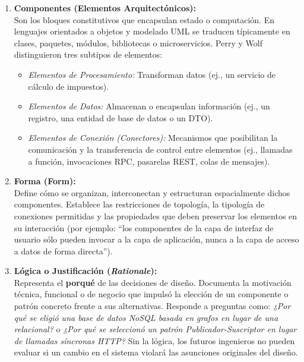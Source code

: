 \begin{enumerate}[leftmargin=1.5em]
  \item \textbf{Componentes (Elementos Arquitectónicos):}\\
  Son los bloques constitutivos que encapsulan estado o computación. En lenguajes orientados a objetos y modelado UML se traducen típicamente en clases, paquetes, módulos, bibliotecas o microservicios. Perry y Wolf distinguieron tres subtipos de elementos:
  \begin{itemize}
    \item \emph{Elementos de Procesamiento:} Transforman datos (ej., un servicio de cálculo de impuestos).
    \item \emph{Elementos de Datos:} Almacenan o encapsulan información (ej., un registro, una entidad de base de datos o un DTO).
    \item \emph{Elementos de Conexión (Conectores):} Mecanismos que posibilitan la comunicación y la transferencia de control entre elementos (ej., llamadas a función, invocaciones RPC, pasarelas REST, colas de mensajes).
  \end{itemize}

  \item \textbf{Forma (Form):}\\
  Define cómo se organizan, interconectan y estructuran espacialmente dichos componentes. Establece las restricciones de topología, la tipología de conexiones permitidas y las propiedades que deben preservar los elementos en su interacción (por ejemplo: ``los componentes de la capa de interfaz de usuario sólo pueden invocar a la capa de aplicación, nunca a la capa de acceso a datos de forma directa'').

  \item \textbf{Lógica o Justificación (\emph{Rationale}):}\\
  Representa el \textbf{porqué} de las decisiones de diseño. Documenta la motivación técnica, funcional o de negocio que impulsó la elección de un componente o patrón concreto frente a sus alternativas. Responde a preguntas como: \emph{¿Por qué se eligió una base de datos NoSQL basada en grafos en lugar de una relacional?} o \emph{¿Por qué se seleccionó un patrón Publicador-Suscriptor en lugar de llamadas síncronas HTTP?} Sin la lógica, los futuros ingenieros no pueden evaluar si un cambio en el sistema violará las asunciones originales del diseño.
\end{enumerate}

